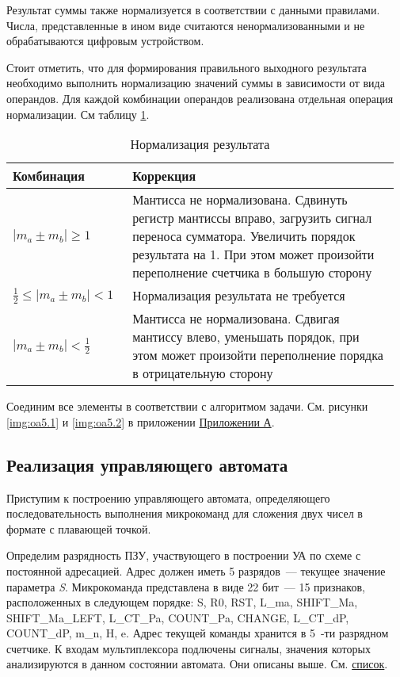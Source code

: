 \documentclass[a4paper,14pt]{extarticle}
\begin{document}
Результат суммы также нормализуется в соответствии с данными правилами. Числа, представленные в ином виде считаются ненормализованными и не обрабатываются цифровым устройством.

Стоит отметить, что для формирования правильного выходного результата необходимо выполнить нормализацию значений суммы в зависимости от вида операндов. Для каждой комбинации операндов реализована отдельная операция нормализации. См таблицу \ref{tab:correction5}.

\begin{table}
	\small
	\begin{tabular}{|m{0.3\linewidth}|m{0.67\linewidth}|}
		\hline
		\textbf{Комбинация} &\textbf{Коррекция}\\
		\hline
		 $\left|m_a\pm m_b\right|\ge1$ & Мантисса не нормализована. Сдвинуть регистр мантиссы вправо, загрузить сигнал переноса сумматора. Увеличить порядок результата на 1. При этом может произойти переполнение счетчика в большую сторону \\ 
		\hline
		$\frac12\le \left|m_a\pm m_b\right|< 1$ & Нормализация результата не требуется\\
		\hline
		$\left|m_a\pm m_b\right|<\frac12$ & Мантисса не нормализована. Сдвигая мантиссу влево, уменьшать порядок, при этом может произойти переполнение порядка в отрицательную сторону\\
		\hline
	\end{tabular}
	\caption{Нормализация результата}
	\label{tab:correction5}
\end{table}

Соединим все элементы в соответствии с алгоритмом задачи. См. рисунки \ref{img:oa5.1} и \ref{img:oa5.2} в приложении \hyperref[tam]{Приложении А}.

\subsection {Реализация управляющего автомата}
Приступим к построению управляющего автомата, определяющего последовательность выполнения микрокоманд для сложения двух чисел в формате с плавающей точкой.

Определим разрядность ПЗУ, участвующего в построении УА по схеме с постоянной адресацией. Адрес должен иметь 5 разрядов~--- текущее значение параметра \textit{S}. Микрокоманда представлена в виде 22 бит~--- 15 признаков, расположенных в следующем порядке: S,	R0,	RST,	L\_ma,	SHIFT\_Ma,	SHIFT\_Ma\_LEFT,	L\_CT\_Pa,	COUNT\_Pa,	CHANGE,	L\_CT\_dP,	COUNT\_dP,	m\_n,	H,	e. Адрес текущей команды хранится в 5~-ти разрядном счетчике. К входам мультиплексора подлючены сигналы, значения которых анализируются в данном состоянии автомата. Они описаны выше. См. \hyperlink{name}{список}.
\end{document}
